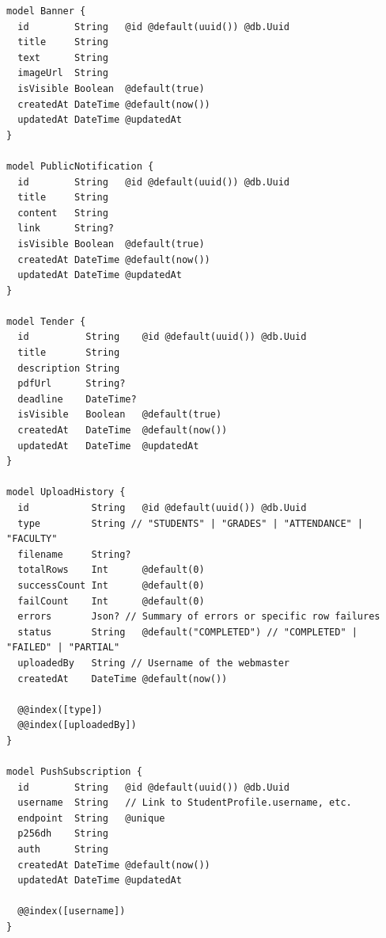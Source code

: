 \documentclass[11pt,a4paper,oneside]{article}
\begin{document}
\begin{lstlisting}
model Banner {
  id        String   @id @default(uuid()) @db.Uuid
  title     String
  text      String
  imageUrl  String
  isVisible Boolean  @default(true)
  createdAt DateTime @default(now())
  updatedAt DateTime @updatedAt
}

model PublicNotification {
  id        String   @id @default(uuid()) @db.Uuid
  title     String
  content   String
  link      String?
  isVisible Boolean  @default(true)
  createdAt DateTime @default(now())
  updatedAt DateTime @updatedAt
}

model Tender {
  id          String    @id @default(uuid()) @db.Uuid
  title       String
  description String
  pdfUrl      String?
  deadline    DateTime?
  isVisible   Boolean   @default(true)
  createdAt   DateTime  @default(now())
  updatedAt   DateTime  @updatedAt
}

model UploadHistory {
  id           String   @id @default(uuid()) @db.Uuid
  type         String // "STUDENTS" | "GRADES" | "ATTENDANCE" | "FACULTY"
  filename     String?
  totalRows    Int      @default(0)
  successCount Int      @default(0)
  failCount    Int      @default(0)
  errors       Json? // Summary of errors or specific row failures
  status       String   @default("COMPLETED") // "COMPLETED" | "FAILED" | "PARTIAL"
  uploadedBy   String // Username of the webmaster
  createdAt    DateTime @default(now())

  @@index([type])
  @@index([uploadedBy])
}

model PushSubscription {
  id        String   @id @default(uuid()) @db.Uuid
  username  String   // Link to StudentProfile.username, etc.
  endpoint  String   @unique
  p256dh    String
  auth      String
  createdAt DateTime @default(now())
  updatedAt DateTime @updatedAt

  @@index([username])
}

\end{lstlisting}
\end{document}
